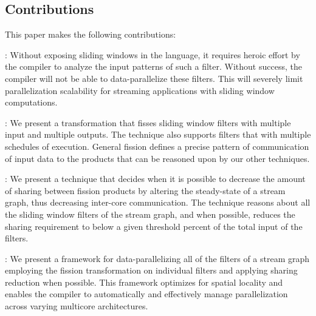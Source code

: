 \subsection{Contributions}
This paper makes the following contributions:
\begin{itemize}
  : Without exposing sliding windows in the language, it
  requires heroic effort by the compiler to analyze the input patterns
  of such a filter. Without success, the compiler will not be able to
  data-parallelize these filters.  This will severely limit
  parallelization scalability for streaming applications with sliding
  window computations.

  : We present a
  transformation that fisses sliding window filters with multiple
  input and multiple outputs.  The technique also supports filters
  that with multiple schedules of execution.  General fission defines
  a precise pattern of communication of input data to the products
  that can be reasoned upon by our other techniques.

  : We present a technique that decides when
  it is possible to decrease the amount of sharing between fission
  products by altering the steady-state of a stream graph, thus
  decreasing inter-core communication.  The technique reasons about
  all the sliding window filters of the stream graph, and when
  possible, reduces the sharing requirement to below a given threshold
  percent of the total input of the filters.

  : We present a
  framework for data-parallelizing all of the filters of a stream
  graph employing the fission transformation on individual filters and
  applying sharing reduction when possible.  This framework optimizes
  for spatial locality and enables the compiler to automatically and
  effectively manage parallelization across varying multicore
  architectures.
\end{itemize}

